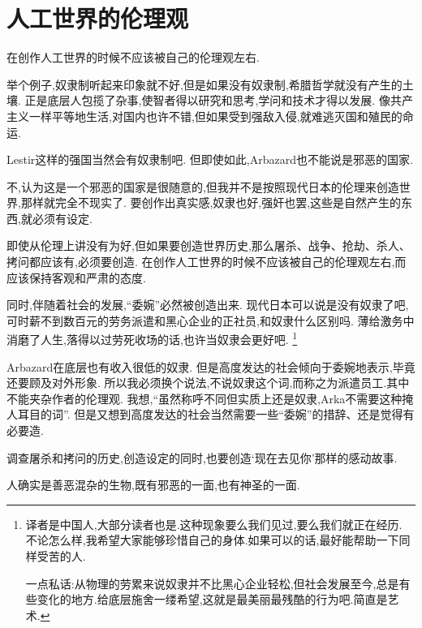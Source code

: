 \chapter[人工世界的伦理观]{人工世界的伦理观}
在创作人工世界的时候不应该被自己的伦理观左右.

举个例子,奴隶制听起来印象就不好,但是如果没有奴隶制,希腊哲学就没有产生的土壤.
正是底层人包揽了杂事,使智者得以研究和思考,学问和技术才得以发展.
像共产主义一样平等地生活,对国内也许不错,但如果受到强敌入侵,就难逃灭国和殖民的命运.

Lestir这样的强国当然会有奴隶制吧.
但即使如此,Arbazard也不能说是邪恶的国家.

不,认为这是一个邪恶的国家是很随意的,但我并不是按照现代日本的伦理来创造世界,那样就完全不现实了.
要创作出真实感,奴隶也好,强奸也罢,这些是自然产生的东西,就必须有设定.

即使从伦理上讲没有为好,但如果要创造世界历史,那么屠杀、战争、抢劫、杀人、拷问都应该有,必须要创造.
在创作人工世界的时候不应该被自己的伦理观左右,而应该保持客观和严肃的态度.


同时,伴随着社会的发展,``委婉''必然被创造出来.
现代日本可以说是没有奴隶了吧,可时薪不到数百元的劳务派遣和黑心企业的正社员,和奴隶什么区别吗.
薄给激务中消磨了人生,落得以过劳死收场的话,也许当奴隶会更好吧.
\footnote{译者是中国人,大部分读者也是.这种现象要么我们见过,要么我们就正在经历.
不论怎么样,我希望大家能够珍惜自己的身体.如果可以的话,最好能帮助一下同样受苦的人.

一点私话:从物理的劳累来说奴隶并不比黑心企业轻松,但社会发展至今,总是有些变化的地方.给底层施舍一缕希望,这就是最美丽最残酷的行为吧.简直是艺术.
}

Arbazard在底层也有收入很低的奴隶.
但是高度发达的社会倾向于委婉地表示,毕竟还要顾及对外形象.
所以我必须换个说法,不说奴隶这个词,而称之为派遣员工.其中不能夹杂作者的伦理观.
我想,``虽然称呼不同但实质上还是奴隶,Arka不需要这种掩人耳目的词''.
但是又想到高度发达的社会当然需要一些``委婉''的措辞、还是觉得有必要造.

调查屠杀和拷问的历史,创造设定的同时,也要创造‘现在去见你’那样的感动故事.

人确实是善恶混杂的生物,既有邪恶的一面,也有神圣的一面.